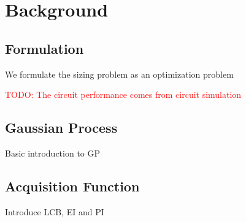 \section{Background}

\subsection{Formulation}

We formulate the sizing problem as an optimization problem

\textcolor{red}{TODO: The circuit performance comes from circuit simulation}


\subsection{Gaussian Process}

Basic introduction to GP

\subsection{Acquisition Function}

Introduce LCB, EI and PI
